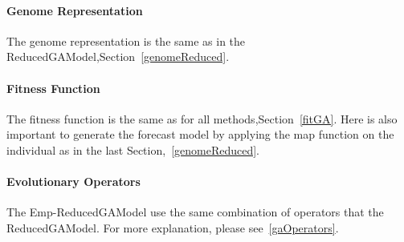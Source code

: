 \paragraph{\textbf{Genome Representation}}
The genome representation is the same as in the ReducedGAModel,Section~\ref{genomeReduced}. 

\paragraph{\textbf{Fitness Function}}
The fitness function is the same as for all methods,Section~\ref{fitGA}. Here is also important to generate the forecast model by applying the map function on the individual as in the last Section,~\ref{genomeReduced}.

\paragraph{\textbf{Evolutionary Operators}}
The Emp-ReducedGAModel use the same combination of operators that the ReducedGAModel. For more explanation, please see~\ref{gaOperators}.


